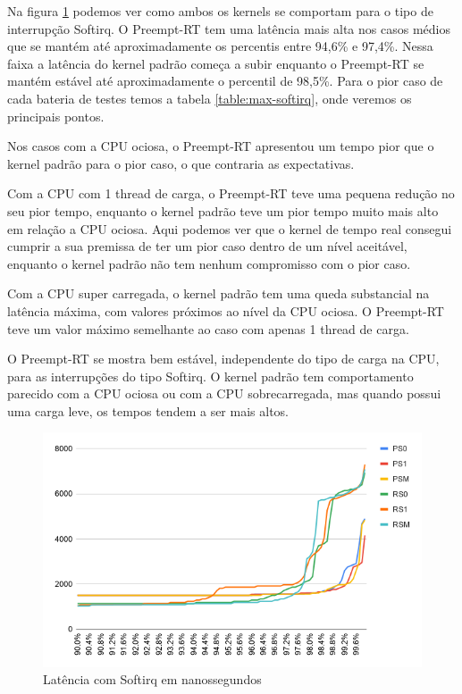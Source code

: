 Na figura \ref{grafico:softirq} podemos ver como ambos os kernels se comportam para o tipo de interrupção Softirq. O Preempt-RT tem uma latência mais alta nos casos médios que se mantém até aproximadamente os percentis entre 94,6\% e 97,4\%. Nessa faixa a latência do kernel padrão começa a subir enquanto o Preempt-RT se mantém estável até aproximadamente o percentil de 98,5\%. Para o pior caso de cada bateria de testes temos a tabela \ref{table:max-softirq}, onde veremos os principais pontos.

Nos casos com a CPU ociosa, o Preempt-RT apresentou um tempo pior que o kernel padrão para o pior caso, o que contraria as expectativas.

Com a CPU com 1 thread de carga, o Preempt-RT teve uma pequena redução no seu pior tempo, enquanto o kernel padrão teve um pior tempo muito mais alto em relação a CPU ociosa. Aqui podemos ver que o kernel de tempo real consegui cumprir a sua premissa de ter um pior caso dentro de um nível aceitável, enquanto o kernel padrão não tem nenhum compromisso com o pior caso.

Com a CPU super carregada, o kernel padrão tem uma queda substancial na latência máxima, com valores próximos ao nível da CPU ociosa. O Preempt-RT teve um valor máximo semelhante ao caso com apenas 1 thread de carga.

O Preempt-RT se mostra bem estável, independente do tipo de carga na CPU, para as interrupções do tipo Softirq. O kernel padrão tem comportamento parecido com a CPU ociosa ou com a CPU sobrecarregada, mas quando possui uma carga leve, os tempos tendem a ser mais altos.

\begin{figure}[!htb]
    \centering
    \includegraphics[width=1.0\textwidth]{graficos/softirq.png}
    \caption{Latência com Softirq em nanossegundos}
    \label{grafico:softirq}
\end{figure}

